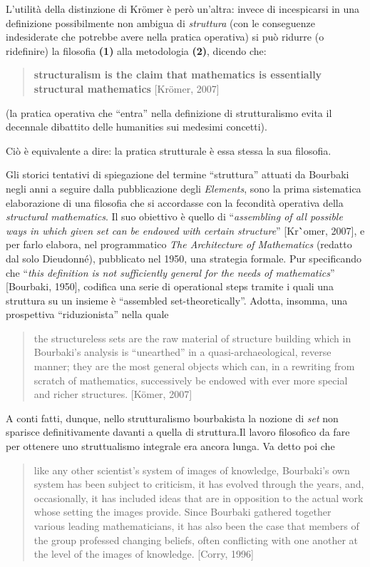 \documentclass[a4paper, 11pt]{article}
\begin{document}
L'utilità della distinzione di Kr\"omer è però un'altra: invece di incespicarsi in una definizione possibilmente non ambigua di \textit{struttura} (con le conseguenze indesiderate che potrebbe avere nella pratica operativa) si può ridurre (o ridefinire) la filosofia \textbf{(1)} alla metodologia \textbf{(2)}, dicendo che:
\begin{quotation}
	\textbf{structuralism is the claim that mathematics
		is essentially structural mathematics} [Kr\"omer, 2007]
\end{quotation}
(la pratica operativa che ``entra'' nella definizione di strutturalismo evita il decennale dibattito delle humanities sui medesimi concetti).

Ciò è equivalente a dire: la pratica strutturale è essa stessa la sua filosofia.

Gli storici tentativi di spiegazione del termine ``struttura'' attuati da Bourbaki negli anni a seguire dalla pubblicazione degli \textit{Elements}, sono la prima sistematica elaborazione di una filosofia che si accordasse con la fecondità operativa della \textit{structural mathematics}. Il suo obiettivo è quello di ``\textit{assembling of all possible ways in which given set can be endowed with certain structure}'' [Kr\``omer, 2007], e per farlo elabora, nel programmatico \textit{The Architecture of Mathematics} (redatto dal solo Dieudonné), pubblicato nel 1950, una strategia formale. Pur specificando che ``\textit{this definition is not sufficiently general for the needs of mathematics}'' [Bourbaki, 1950], codifica una serie di operational steps tramite i quali una struttura su un insieme è ``assembled set-theoretically''. Adotta, insomma, una prospettiva ``riduzionista'' nella quale
\begin{quotation}
	the structureless sets are
	the raw material of structure building which in Bourbaki’s analysis is “unearthed”
	in a quasi-archaeological, reverse manner; they are the most general objects which
	can, in a rewriting from scratch of mathematics, successively be endowed with
	ever more special and richer structures. [K\"omer, 2007]
\end{quotation}
A conti fatti, dunque, nello strutturalismo bourbakista la nozione di \textit{set} non sparisce definitivamente davanti a quella di struttura.Il lavoro filosofico da fare per ottenere uno struttualismo integrale era ancora lunga. Va detto poi che
\begin{quotation}
	like any other scientist's
	system of images of knowledge, Bourbaki's own system has been subject
	to criticism, it has evolved through the years, and, occasionally, it has
	included ideas that are in opposition to the actual work whose setting the
	images provide. Since Bourbaki gathered together various leading mathematicians,
	it has also been the case that members of the group professed changing
	beliefs, often conflicting with one another at the level of the images of knowledge. [Corry, 1996]
\end{quotation}
\end{document}
